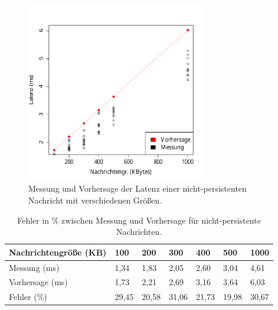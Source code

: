 \begin{figure}
\center
  \includegraphics[width=0.7\textwidth]{images/modelSimulationResults/simulation1.pdf}
  \caption{Messung und Vorhersage der Latenz einer nicht-persistenten Nachricht mit verschiedenen Größen.}
  \label{img:simulation1}
\end{figure}

\begin{table}
\centering
  \begin{tabular}{| l | l | l | l |l | l | l |}
    \hline
    Nachrichtengröße (KB) & 100 & 200 & 300 & 400 & 500 & 1000 \\ \hline
    Messung (ms) & 1,34 & 1,83 & 2,05 & 2,60 & 3,04 & 4,61\\ \hline
    Vorhersage (ms) & 1,73 & 2,21 & 2,69 & 3,16 & 3,64 & 6,03\\ \hline
    Fehler (\%) & 29,45 & 20,58 & 31,06 & 21,73 & 19,98 & 30,67\\ \hline
    
    \hline
      \end{tabular}
	\caption{\label{tab:sim1} Fehler in \% zwischen Messung und Vorhersage für nicht-persistente Nachrichten.}
\end{table}

